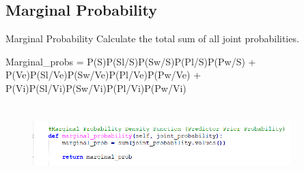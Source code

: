 \documentclass{beamer}
\begin{document}
\subsection{Marginal Probability}
    \begin{frame}{Marginal Probability}
        \hspace{0.5cm} Calculate the total sum of all joint probabilities.
        \begin{center}
            \textcolor[rgb]{1.0,0.0,0.0} {Marginal\_probs = P(S)P(Sl/S)P(Sw/S)P(Pl/S)P(Pw/S) 
                                                         + P(Ve)P(Sl/Ve)P(Sw/Ve)P(Pl/Ve)P(Pw/Ve) 
                                                         + P(Vi)P(Sl/Vi)P(Sw/Vi)P(Pl/Vi)P(Pw/Vi)}\\
        \end{center}
        \begin{center}
            \begin{figure}
                \begin{center}
                    \includegraphics[width = 10cm, height = 3cm]{Theme/images/margimal_probs.PNG}
                \end{center}
            \end{figure}
        \end{center}
    \end{frame}
\end{document}
